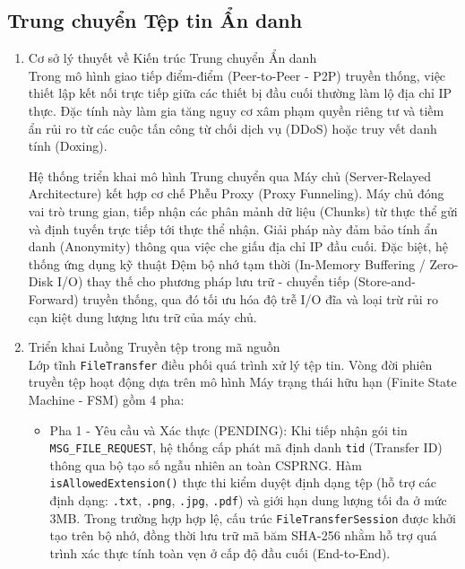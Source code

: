 \subsection{Trung chuyển Tệp tin Ẩn danh}

\begin{enumerate}
    \item Cơ sở lý thuyết về Kiến trúc Trung chuyển Ẩn danh \\
    Trong mô hình giao tiếp điểm-điểm (Peer-to-Peer - P2P) truyền thống, việc thiết lập kết nối trực tiếp giữa các thiết bị đầu cuối thường làm lộ địa chỉ IP thực. Đặc tính này làm gia tăng nguy cơ xâm phạm quyền riêng tư và tiềm ẩn rủi ro từ các cuộc tấn công từ chối dịch vụ (DDoS) hoặc truy vết danh tính (Doxing). 
    
    Hệ thống triển khai mô hình Trung chuyển qua Máy chủ (Server-Relayed Architecture) kết hợp cơ chế Phễu Proxy (Proxy Funneling). Máy chủ đóng vai trò trung gian, tiếp nhận các phân mảnh dữ liệu (Chunks) từ thực thể gửi và định tuyến trực tiếp tới thực thể nhận. Giải pháp này đảm bảo tính ẩn danh (Anonymity) thông qua việc che giấu địa chỉ IP đầu cuối. Đặc biệt, hệ thống ứng dụng kỹ thuật Đệm bộ nhớ tạm thời (In-Memory Buffering / Zero-Disk I/O) thay thế cho phương pháp lưu trữ - chuyển tiếp (Store-and-Forward) truyền thống, qua đó tối ưu hóa độ trễ I/O đĩa và loại trừ rủi ro cạn kiệt dung lượng lưu trữ của máy chủ.

    \item Triển khai Luồng Truyền tệp trong mã nguồn \\
    Lớp tĩnh \texttt{FileTransfer} điều phối quá trình xử lý tệp tin. Vòng đời phiên truyền tệp hoạt động dựa trên mô hình Máy trạng thái hữu hạn (Finite State Machine - FSM) gồm 4 pha:
    
    \begin{itemize}[label={-}]
        \item Pha 1 - Yêu cầu và Xác thực (PENDING): Khi tiếp nhận gói tin \texttt{MSG\_FILE\_REQUEST}, hệ thống cấp phát mã định danh \texttt{tid} (Transfer ID) thông qua bộ tạo số ngẫu nhiên an toàn CSPRNG. Hàm \texttt{isAllowedExtension()} thực thi kiểm duyệt định dạng tệp (hỗ trợ các định dạng: \texttt{.txt}, \texttt{.png}, \texttt{.jpg}, \texttt{.pdf}) và giới hạn dung lượng tối đa ở mức 3MB. Trong trường hợp hợp lệ, cấu trúc \texttt{FileTransferSession} được khởi tạo trên bộ nhớ, đồng thời lưu trữ mã băm SHA-256 nhằm hỗ trợ quá trình xác thực tính toàn vẹn ở cấp độ đầu cuối (End-to-End).
        

\end{itemize}
\end{enumerate}
